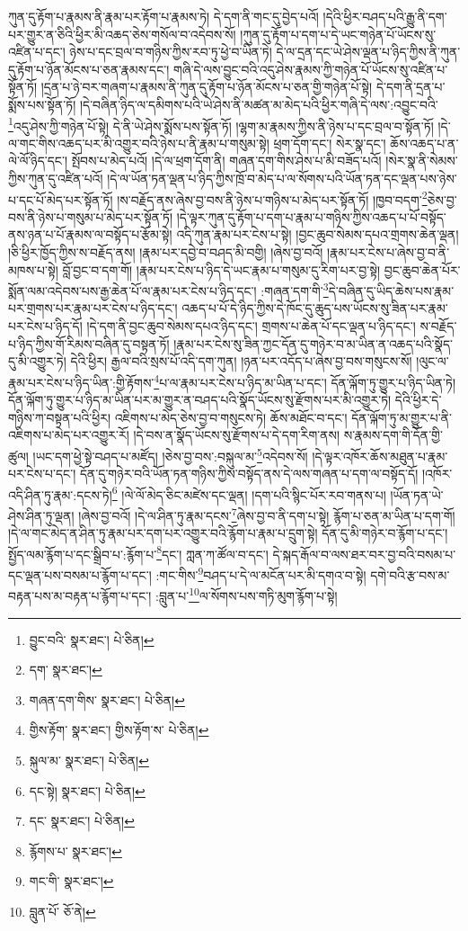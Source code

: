 ཀུན་དུ་རྟོག་པ་རྣམས་ནི་རྣམ་པར་རྟོག་པ་རྣམས་ཏེ། དེ་དག་ནི་གང་དུ་བྱེད་པའོ། །དེའི་ཕྱིར་བཤད་པའི་རྒྱུ་ནི་དག་པར་གྱུར་ན་ཅིའི་ཕྱིར་མི་འཆད་ཅེས་གསོལ་བ་འདེབས་སོ། །ཀུན་དུ་རྟོག་པ་དག་པ་དེ་ཡང་གཉེན་པོ་ཡོངས་སུ་འཛིན་པ་དང་། ཉེས་པ་དང་བྲལ་བ་གཉིས་ཀྱིས་རབ་ཏུ་ཕྱེ་བ་ཡིན་ཏེ། དེ་ལ་དྲན་དང་ཡེ་ཤེས་ལྡན་པ་ཉིད་ཀྱིས་ནི་ཀུན་དུ་རྟོག་པ་ཉོན་མོངས་པ་ཅན་རྣམས་དང་། གཞི་དེ་ལས་བྱུང་བའི་འདུ་ཤེས་རྣམས་ཀྱི་གཉེན་པོ་ཡོངས་སུ་འཛིན་པ་སྟོན་ཏོ། །དྲན་པ་ཉེ་བར་གཞག་པ་རྣམས་ནི་ཀུན་དུ་རྟོག་པ་ཉོན་མོངས་པ་ཅན་གྱི་གཉེན་པོ་སྟེ། དེ་དག་ནི་དྲན་པ་སྨོས་པས་སྟོན་ཏོ། །དེ་བཞིན་ཉིད་ལ་དམིགས་པའི་ཡེ་ཤེས་ནི་མཚན་མ་མེད་པའི་ཕྱིར་གཞི་དེ་ལས་:འབྱུང་བའི་\footnote{བྱུང་བའི་  སྣར་ཐང་།  པེ་ཅིན། }འདུ་ཤེས་ཀྱི་གཉེན་པོ་སྟེ། དེ་ནི་ཡེ་ཤེས་སྨོས་པས་སྟོན་ཏོ། །ལྷག་མ་རྣམས་ཀྱིས་ནི་ཉེས་པ་དང་བྲལ་བ་སྟོན་ཏོ། །དེ་ལ་གང་གིས་འཆད་པར་མི་འགྱུར་བའི་ཉེས་པ་ནི་རྣམ་པ་གསུམ་སྟེ། ཕྲག་དོག་དང་། སེར་སྣ་དང་། ཆོས་འཆད་པ་ན་ལེ་ལོ་ཉིད་དང་། སྤོབས་པ་མེད་པའོ། །དེ་ལ་ཕྲག་དོག་ནི། གཞན་དག་གིས་ཤེས་པ་མི་བཟོད་པའོ། །སེར་སྣ་ནི་སེམས་ཀྱིས་ཀུན་དུ་འཛིན་པའོ། །དེ་ལ་ཡོན་ཏན་ལྡན་པ་ཉིད་ཀྱིས་ཁྲོ་བ་མེད་པ་ལ་སོགས་པའི་ཡོན་ཏན་དང་ལྡན་པས་ཉེས་པ་དང་པོ་མེད་པར་སྟོན་ཏོ། །ས་བརྗོད་ནས་ཞེས་བྱ་བས་ནི་ཉེས་པ་གཉིས་པ་མེད་པར་སྟོན་ཏོ། །ཁྱབ་བདག་\footnote{དག་  སྣར་ཐང་། }ཅེས་བྱ་བས་ནི་ཉེས་པ་གསུམ་པ་མེད་པར་སྟོན་ཏོ། །དེ་ལྟར་ཀུན་དུ་རྟོག་པ་དག་པ་རྣམ་པ་གཉིས་ཀྱིས་འཆད་པ་པོ་བསྟོད་ནས་ཉན་པ་པོ་རྣམས་ལ་བསྟོད་པ་རྩོམ་སྟེ། འདི་ཀུན་རྣམ་པར་ངེས་པ་སྟེ། །བྱང་ཆུབ་སེམས་དཔའ་གྲགས་ཆེན་ལྡན། །ཅི་ཕྱིར་ཁྱོད་ཀྱིས་ས་བརྗོད་ནས། །རྣམ་པར་དབྱེ་བ་བཤད་མི་བགྱི། །ཞེས་བྱ་བའོ། །རྣམ་པར་ངེས་པ་ཞེས་བྱ་བ་ནི་མཁས་པ་སྟེ། བློ་བྱང་བ་དག་གོ། །རྣམ་པར་ངེས་པ་ཉིད་དེ་ཡང་རྣམ་པ་གསུམ་དུ་རིག་པར་བྱ་སྟེ། བྱང་ཆུབ་ཆེན་པོར་སྨོན་ལམ་འདེབས་པས་རྒྱ་ཆེན་པོ་ལ་རྣམ་པར་ངེས་པ་ཉིད་དང་། :གཞན་དག་གི་\footnote{གཞན་དག་གིས་  སྣར་ཐང་།  པེ་ཅིན། }དེ་བཞིན་དུ་ཡིད་ཆེས་པས་རྣམ་པར་གྲགས་པར་རྣམ་པར་ངེས་པ་ཉིད་དང་། འཆད་པ་པོ་དེ་ཉིད་ཀྱིས་དེ་ཁོང་དུ་ཆུད་པས་ཡོངས་སུ་ཟིན་པར་རྣམ་པར་ངེས་པ་ཉིད་དོ། །དེ་དག་ནི་བྱང་ཆུབ་སེམས་དཔའ་ཉིད་དང་། གྲགས་པ་ཆེན་པོ་དང་ལྡན་པ་ཉིད་དང་། ས་བརྗོད་པ་ཉིད་ཀྱིས་གོ་རིམས་བཞིན་དུ་བསྟན་ཏོ། །རྣམ་པར་ངེས་སུ་ཟིན་ཀྱང་དོན་དུ་གཉེར་བ་མ་ཡིན་ན་འཆད་པའི་སྣོད་དུ་མི་འགྱུར་ཏེ། དེའི་ཕྱིར། རྒྱལ་བའི་སྲས་པོ་འདི་དག་ཀུན། །ཉན་པར་འདོད་པ་ཞེས་བྱ་བས་གསུངས་སོ། །ལུང་ལ་རྣམ་པར་ངེས་པ་ཉིད་ཡིན་:གྱི་རྟོགས་\footnote{གྱིས་རྟོག་  སྣར་ཐང་། གྱིས་རྟོག་ས་  པེ་ཅིན། }པ་ལ་རྣམ་པར་ངེས་པ་ཉིད་མ་ཡིན་པ་དང་། དོན་ལྐོག་ཏུ་གྱུར་པ་ཉིད་ཡིན་ཏེ། དོན་ལྐོག་ཏུ་གྱུར་པ་ཉིད་མ་ཡིན་པར་མ་གྱུར་ན་བཤད་པའི་སྣོད་ཡོངས་སུ་རྫོགས་པར་མི་འགྱུར་ཏེ། དེའི་ཕྱིར་དེ་གཉིས་ཀ་བསྟན་པའི་ཕྱིར། འཇིགས་པ་མེད་ཅེས་བྱ་བ་གསུངས་ཏེ། ཆོས་མཐོང་བ་དང་། དོན་ལྐོག་ཏུ་མ་གྱུར་པ་ནི་འཇིགས་པ་མེད་པར་འགྱུར་རོ། །དེ་བས་ན་སྣོད་ཡོངས་སུ་རྫོགས་པ་དེ་དག་རིག་ནས། ས་རྣམས་དག་གི་དོན་གྱི་ཚུལ། །ཡང་དག་ཕྱེ་སྟེ་བཤད་པ་མཛོད། །ཅེས་བྱ་བས་:བསྐུལ་མ་\footnote{སྐུལ་མ་  སྣར་ཐང་།  པེ་ཅིན། }འདེབས་སོ། །དེ་ལྟར་འཁོར་ཆོས་མཐུན་པ་རྣམ་པར་ངེས་པ་དང་། དོན་དུ་གཉེར་བའི་ཡོན་ཏན་གཉིས་ཀྱིས་བསྟོད་ནས་དེ་ལས་གཞན་པ་དག་ལ་བསྟོད་དོ། །འཁོར་འདི་ཤིན་ཏུ་རྣམ་:དངས་ཏེ།\footnote{དང་སྟེ།  སྣར་ཐང་།  པེ་ཅིན། } །ལེ་ལོ་མེད་ཅིང་མཛེས་དང་ལྡན། །དག་པའི་སྙིང་པོར་རབ་གནས་པ། །ཡོན་ཏན་ཡེ་ཤེས་ཤིན་ཏུ་ལྡན། །ཞེས་བྱ་བའོ། །དེ་ལ་ཤིན་ཏུ་རྣམ་དངས་\footnote{དང་  སྣར་ཐང་།  པེ་ཅིན། }ཞེས་བྱ་བ་ནི་དག་པ་སྟེ། རྙོག་པ་ཅན་མ་ཡིན་པ་དག་གོ། །དེ་ལ་གང་མེད་ན་ཤིན་ཏུ་རྣམ་པར་དག་པར་འགྱུར་བའི་རྙོག་པ་རྣམ་པ་དྲུག་སྟེ། དོན་དུ་མི་གཉེར་བ་རྙོག་པ་དང་། སྤྱོད་ལམ་རྙོག་པ་དང་སྒྲིབ་པ་:རྙོག་པ་\footnote{རྙོགས་པ་  སྣར་ཐང་། }དང་། ཀླན་ཀ་ཚོལ་བ་དང་། དེ་སྐད་རྒོལ་བ་ལས་ཐར་བར་བྱ་བའི་བསམ་པ་དང་ལྡན་པས་བསམ་པ་རྙོག་པ་དང་། :གང་གིས་\footnote{གང་གི་  སྣར་ཐང་། }བཤད་པ་དེ་ལ་མངོན་པར་མི་དགའ་བ་སྟེ། དགེ་བའི་རྩ་བས་མ་བརྟན་པས་མ་བརྟན་པ་རྙོག་པ་དང་། :བླུན་པ་\footnote{བླུན་པོ་  ཅོ་ནེ། }ལ་སོགས་པས་གཏི་མུག་རྙོག་པ་སྟེ། 
